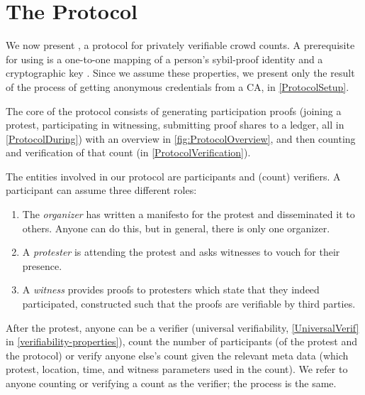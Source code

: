\section{The \CROCUS Protocol}%
\label{Protocol}


We now present \CROCUS, a protocol for privately verifiable crowd
counts. A prerequisite for using \CROCUS is a one-to-one mapping of a person's
sybil-proof identity and a cryptographic key%
. Since we assume these properties, we
present only the result of the process of getting anonymous
credentials from a \ac{CA}, in \cref{ProtocolSetup}.

The core of the \CROCUS protocol consists of generating participation
proofs (joining a protest, participating in witnessing, submitting
proof shares to a ledger, all in \cref{ProtocolDuring}) with an overview in \cref{fig:ProtocolOverview}, and then counting and
verification of that count (in \cref{ProtocolVerification}). 


The entities involved in our protocol are participants and (count) verifiers.
A participant can assume three different roles:
\begin{enumerate}
\item The \emph{organizer} has written a manifesto for the protest and 
  disseminated it to others.
  Anyone can do this, but in general, there is only one organizer.
\item A \emph{protester} is attending the protest and asks witnesses to vouch 
  for their presence.
\item A \emph{witness} provides proofs to protesters which state that they indeed participated, constructed such that the proofs are verifiable by 
  third parties.
\end{enumerate}
After the protest, anyone can be a verifier (universal verifiability, 
\cref{UniversalVerif} in \cref{verifiability-properties}), \ie count the number 
of participants (of the protest and the protocol) or verify anyone else's count 
given the relevant meta data (which protest, location, time, and witness 
parameters used in the
count). We refer to anyone counting or verifying a count as the
verifier; the process is the same. 

